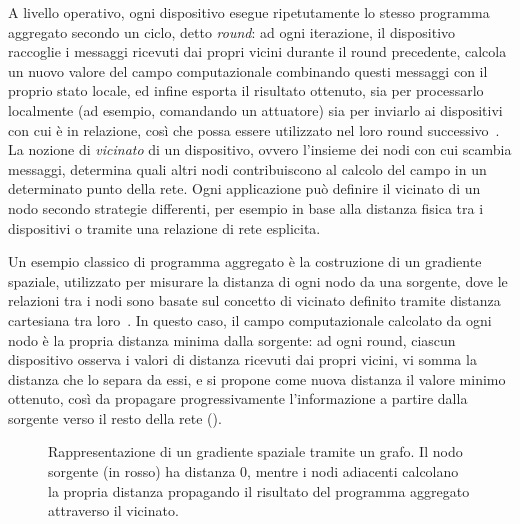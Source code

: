 A livello operativo, ogni dispositivo esegue ripetutamente lo stesso programma
aggregato secondo un ciclo, detto \emph{round}: ad ogni iterazione, il dispositivo
raccoglie i messaggi ricevuti dai propri vicini durante il round precedente,
calcola un nuovo valore del campo computazionale combinando questi messaggi con
il proprio stato locale, ed infine esporta il risultato ottenuto, sia per
processarlo localmente (ad esempio, comandando un attuatore) sia per inviarlo ai
dispositivi con cui è in relazione, così che possa essere utilizzato nel loro
round successivo~\cite{amslaurea37138}.
La nozione di \emph{vicinato} di un dispositivo, ovvero l'insieme dei nodi con
cui scambia messaggi, determina quali altri nodi contribuiscono al calcolo del
campo in un determinato punto della rete.
Ogni applicazione può definire il vicinato di un nodo secondo strategie differenti,
per esempio in base alla distanza fisica tra i dispositivi o tramite una relazione
di rete esplicita.

Un esempio classico di programma aggregato è la costruzione di un gradiente spaziale,
utilizzato per misurare la distanza di ogni nodo da una sorgente, dove le relazioni
tra i nodi sono basate sul concetto di vicinato definito tramite distanza cartesiana tra
loro~\cite{10.1007/978-3-031-95589-1_12}.
In questo caso, il campo computazionale calcolato da ogni nodo è la propria
distanza minima dalla sorgente: ad ogni round, ciascun dispositivo osserva i
valori di distanza ricevuti dai propri vicini, vi somma la distanza che lo
separa da essi, e si propone come nuova distanza il valore minimo ottenuto,
così da propagare progressivamente l'informazione a partire dalla sorgente
verso il resto della rete ().

\begin{figure}[H]
    \centering
    \caption[Rappresentazione di un gradiente spaziale tramite un grafo.]{
    Rappresentazione di un gradiente spaziale tramite un grafo.
    Il nodo sorgente (in rosso) ha distanza 0, mentre i nodi adiacenti calcolano
    la propria distanza propagando il risultato del programma aggregato attraverso
    il vicinato.}
    \label{fig:ac-gradient-example}
\end{figure}

